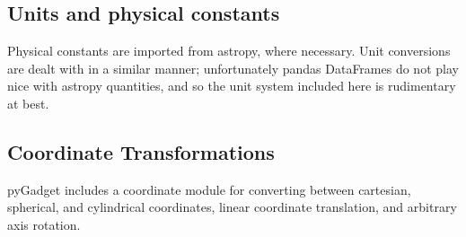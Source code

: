 \subsection{Units and physical constants}
\label{units}
Physical constants are imported from astropy, where necessary.  Unit conversions are dealt with in a similar manner; unfortunately pandas DataFrames do not play nice with astropy quantities, and so the unit system included here is rudimentary at best.

\subsection{Coordinate Transformations}
\label{coordinates}
pyGadget includes a coordinate module for converting between cartesian, spherical, and cylindrical coordinates, linear coordinate translation, and arbitrary axis rotation.